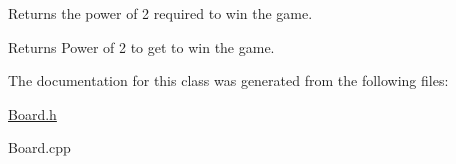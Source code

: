 Returns the power of 2 required to win the game. 

\begin{DoxyReturn}{Returns}
Power of 2 to get to win the game. 
\end{DoxyReturn}


The documentation for this class was generated from the following files\-:\begin{DoxyCompactItemize}
\item 
\hyperlink{_board_8h}{Board.\-h}\item 
Board.\-cpp\end{DoxyCompactItemize}
